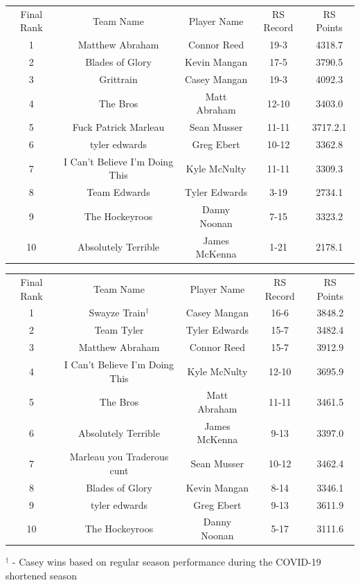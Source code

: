 \documentclass[11pt,letterpaper]{article}
\begin{document}
\newpage
{}
\vspace{-25pt}
\begin{table} [h]
\begin{center}
\begin{tabular} { c c c c c }
\\ Final Rank & Team Name & Player Name & RS Record & RS Points
\\ 1 & Matthew Abraham & Connor Reed & 19-3 & 4318.7
\\ 2 & Blades of Glory & Kevin Mangan & 17-5 & 3790.5
\\ 3 & Grittrain & Casey Mangan & 19-3 & 4092.3
\\ 4 & The Bros & Matt Abraham & 12-10 & 3403.0
\\ 5 & Fuck Patrick Marleau & Sean Musser & 11-11 & 3717.2.1
\\ 6 & tyler edwards & Greg Ebert & 10-12 & 3362.8
\\ 7 & I Can't Believe I'm Doing This & Kyle McNulty & 11-11 & 3309.3
\\ 8 & Team Edwards & Tyler Edwards & 3-19 & 2734.1
\\ 9 & The Hockeyroos & Danny Noonan & 7-15 & 3323.2
\\ 10 & Absolutely Terrible & James McKenna & 1-21 & 2178.1
\end{tabular}
\end{center}
\end{table}

\vspace{-25pt}
\begin{table} [h]
\begin{center}
\begin{tabular} { c c c c c }
\\ Final Rank & Team Name & Player Name & RS Record & RS Points
\\ 1 & Swayze Train$^\dag$ & Casey Mangan & 16-6 & 3848.2
\\ 2 & Team Tyler & Tyler Edwards & 15-7 & 3482.4
\\ 3 & Matthew Abraham & Connor Reed & 15-7 & 3912.9
\\ 4 & I Can't Believe I'm Doing This & Kyle McNulty & 12-10 & 3695.9
\\ 5 & The Bros & Matt Abraham & 11-11 & 3461.5
\\ 6 & Absolutely Terrible & James McKenna & 9-13 & 3397.0
\\ 7 & Marleau you Traderous cunt & Sean Musser & 10-12 & 3462.4
\\ 8 & Blades of Glory & Kevin Mangan & 8-14 & 3346.1
\\ 9 & tyler edwards & Greg Ebert & 9-13 & 3611.9
\\ 10 & The Hockeyroos & Danny Noonan & 5-17 & 3111.6
\end{tabular}
\end{center}
\noindent$^\dag$ - Casey wins based on regular season performance during the COVID-19 shortened season
\end{table}
\end{document}
